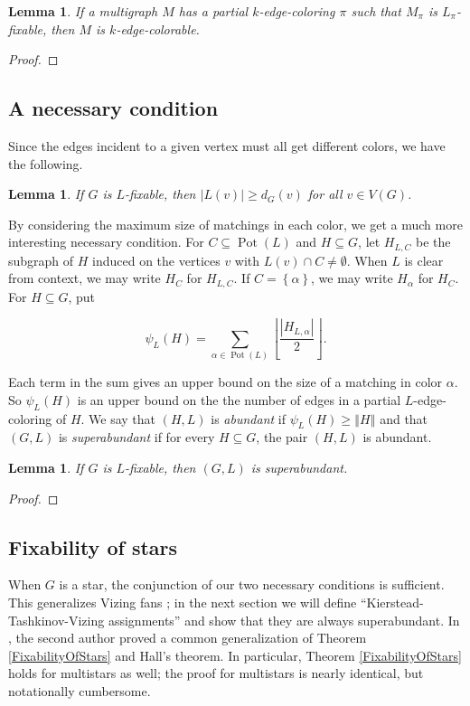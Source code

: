 \documentclass[12pt]{article}
\theoremstyle{plain}
\newtheorem{lem}[thm]{Lemma}
\theoremstyle{definition}
\theoremstyle{remark}
\newcommand{\set}[1]{\left\{ #1 \right\}}
\newcommand{\card}[1]{\left|#1\right|}
\newcommand{\size}[1]{\left\Vert#1\right\Vert}
\newcommand{\floor}[1]{\left\lfloor#1\right\rfloor}
\newcommand{\pot}{\operatorname{Pot}}
\begin{document}
\begin{lem}\label{FixableCompletesColoring}
If a multigraph $M$ has a partial $k$-edge-coloring $\pi$ such that $M_\pi$ is $L_\pi$-fixable, then $M$ is $k$-edge-colorable.
\end{lem}
\begin{proof}
\end{proof}

\subsection{A necessary condition}
Since the edges incident to a given vertex must all get different colors, we have the following.

\begin{lem}\label{DegreeNecessaryCondition}
If $G$ is $L$-fixable, then $|L(v)| \ge d_G(v)$ for all $v \in V(G)$.
\end{lem}

By considering the maximum size of matchings in each color, we get a much more interesting necessary condition.
For $C \subseteq \pot(L)$ and $H \subseteq G$, let $H_{L, C}$ be the
subgraph of $H$ induced on the vertices $v$ with $L(v) \cap C \ne \emptyset$. 
When $L$ is clear from context, we may write $H_C$ for $H_{L,C}$. If $C =
\set{\alpha}$, we may write $H_\alpha$ for $H_C$.  For $H \subseteq G$, put

\[\psi_L(H) = \sum_{\alpha \in \pot(L)} \floor{\frac{\card{H_{L, \alpha}}}{2}}.\]

Each term in the sum gives an upper bound on the size of a matching in color
$\alpha$. So $\psi_L(H)$ is an upper bound on the the number of edges in a
partial $L$-edge-coloring of $H$.  We say that $(H, L)$ is \emph{abundant} if
$\psi_L(H) \ge \size{H}$ and that $(G,L)$ is \emph{superabundant} if for every
$H \subseteq G$, the pair $(H, L)$ is abundant.  

\begin{lem}\label{SuperabundanceIsNecessary}
If $G$ is $L$-fixable, then $(G, L)$ is superabundant.
\end{lem}
\begin{proof}
\end{proof}

\subsection{Fixability of stars}
When $G$ is a star, the conjunction of our two necessary conditions is sufficient. This generalizes Vizing fans \cite{Vizing76}; in the next section we will define ``Kierstead-Tashkinov-Vizing assignments'' and show that they are always superabundant.  In \cite{HallGame}, the second author proved a common generalization of Theorem \ref{FixabilityOfStars} and Hall's theorem.  In particular, Theorem \ref{FixabilityOfStars} holds for multistars as well; the proof for multistars is nearly identical, but notationally cumbersome.
\end{document}

